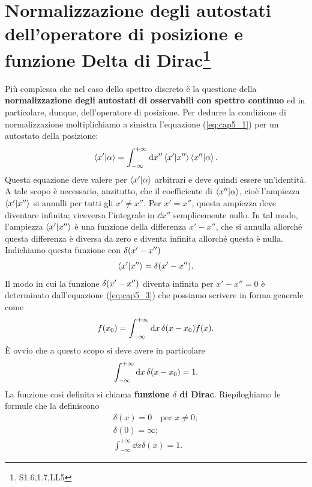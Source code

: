 \section[Normalizzazione degli autostati dell'operatore di posizione e funzione Delta di Dirac]{Normalizzazione degli autostati dell'operatore di posizione e funzione Delta di Dirac\footnote{ S1.6,1.7,LL5}}
Più complessa che nel caso dello spettro discreto è la questione della \textbf{normalizzazione degli autostati di osservabili con spettro continuo}
 ed in particolare, dunque, dell'operatore di posizione.
 Per dedurre la condizione di normalizzazione moltiplichiamo a sinistra l'equazione (\ref{eq:cap5_1}) per un autostato della posizione:
 \begin{equation}
   \label{eq:cap5_3}
   \braket{x'}{\alpha} = \int_{-\infty}^{+\infty}\dd{x''}\braket{x'}{x''}\braket{x''}{\alpha} .
 \end{equation}
Questa equazione deve valere per $\braket{x'}{\alpha}$ arbitrari e deve quindi essere un'identità. A tale scopo è necessario, anzitutto, che il coefficiente di $\braket{x''}{\alpha}$, cioè l'ampiezza $\braket{x'}{x''}$ si annulli per tutti gli $x'\neq x''$. Per $x'=x''$, questa ampiezza deve diventare infinita; viceversa l'integrale in $\dd{x''}$ semplicemente nullo. In tal modo, l'ampiezza $\braket{x'}{x''}$ è una funzione della differenza $x'-x''$, che si annulla allorché questa differenza è diversa da zero e diventa infinita allorché questa è nulla. Indichiamo questa funzione con $\delta\qty(x'-x'')$
\begin{equation}
  \braket{x'}{x''} = \delta\qty(x'-x'') .
\end{equation}
Il modo in cui la funzione $\delta\qty(x'-x'')$ diventa infinita per $x'-x''=0$ è determinato dall'equazione (\ref{eq:cap5_3}) che possiamo scrivere in forma generale come
\begin{equation}
  f\qty(x_0) = \int_{-\infty}^{+\infty}\dd{x}\delta\qty(x-x_0)f\qty(x) .
\end{equation}
È ovvio che a questo scopo si deve avere in particolare
\begin{equation}
  \int_{-\infty}^{+\infty}\dd{x}\delta\qty(x-x_0) = 1 .
\end{equation}
La funzione così definita si chiama \textbf{funzione $\delta$ di Dirac}.
Riepiloghiamo le formule che la definiscono
\begin{align}
  \delta(x) = 0 \quad \text{per }x\neq 0 ; \\
  \delta(0) = \infty ; \\
  \int_{-\infty}^{+\infty}\dd{x}\delta(x)=1 .
\end{align}
